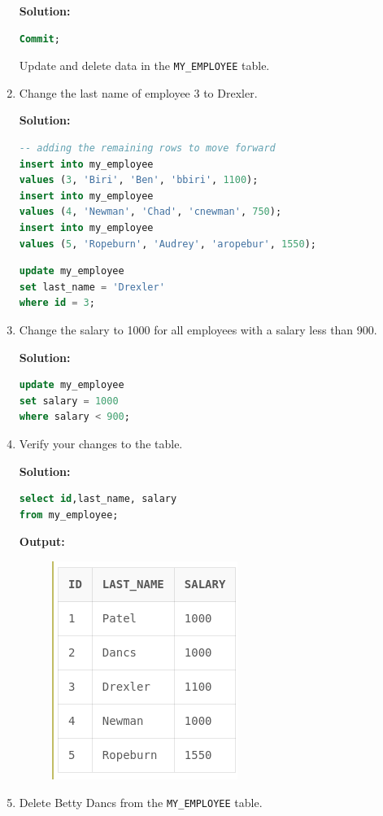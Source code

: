 \begin{enumerate}
    \textbf{Solution: }
    \begin{lstlisting}[language=SQL]
Commit;
    \end{lstlisting}

Update and delete data in the \texttt{MY\_EMPLOYEE} table.
    \item  Change the last name of employee 3 to Drexler.
    
    \textbf{Solution: }
    \begin{lstlisting}[language=SQL]
-- adding the remaining rows to move forward
insert into my_employee
values (3, 'Biri', 'Ben', 'bbiri', 1100);
insert into my_employee
values (4, 'Newman', 'Chad', 'cnewman', 750);
insert into my_employee
values (5, 'Ropeburn', 'Audrey', 'aropebur', 1550);
    \end{lstlisting}
    \begin{lstlisting}[language=SQL]
update my_employee
set last_name = 'Drexler'
where id = 3;
    \end{lstlisting}
    \item  Change the salary to 1000 for all employees with a salary less than 900.
    
    \textbf{Solution: }
    \begin{lstlisting}[language=SQL]
update my_employee
set salary = 1000
where salary < 900;
    \end{lstlisting}
    \item  Verify your changes to the table.
    
    \textbf{Solution: }
    \begin{lstlisting}[language=SQL]
select id,last_name, salary
from my_employee;
    \end{lstlisting}
    
    \textbf{Output: }
    \begin{figure}[h]
        \centering
        \includegraphics[width=0.4\linewidth]{graphics/p812.png}
    \end{figure}
    \item  Delete Betty Dancs from the \texttt{MY\_EMPLOYEE} table.
    

\end{enumerate}
